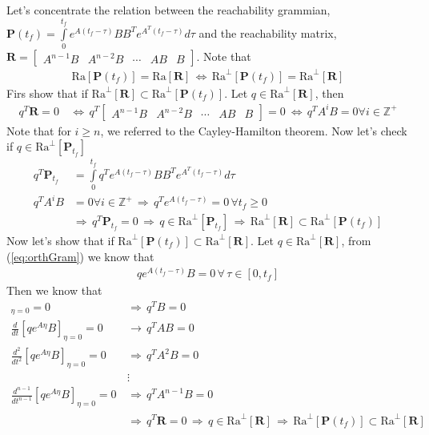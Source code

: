 \documentclass[twoside]{article}
\begin{document}
Let's concentrate the relation between the reachability grammian, $\textbf{P}(t_f) = \int\limits_{0}^{t_f} e^{A (t_f - \tau)} B B^T e^{A^T (t_f - \tau)}  d \tau $ 
and the reachability matrix, $\mathbf{R} = \left[ \begin{array}{c|c|c|c|c} A^{n-1} B & A^{n-2} B & \cdots & A B & B \end{array} \right] $. Note that 
%
\begin{align*}
  \mathrm{Ra}[ \textbf{P}(t_f) ] = \mathrm{Ra}[ \mathbf{R} ]
  \, \iff \, \mathrm{Ra}^\perp [ \textbf{P}(t_f) ] = \mathrm{Ra}^\perp [ \mathbf{R} ]
\end{align*}
%
Firs show that if $\mathrm{Ra}^\perp [ \mathbf{R} ] \subset \mathrm{Ra}^\perp [ \textbf{P}(t_f) ]$.
Let $q \in \mathrm{Ra}^\perp [ \mathbf{R} ] $, then 
%
\begin{align*}
  q^T \mathbf{R} = 0 \, &\iff \, q^T \left[ \begin{array}{c|c|c|c|c} A^{n-1} B & A^{n-2} B & \cdots & A B & B \end{array} \right] = 0 \ \iff \, q^T A^i B = 0 \forall i \in \mathbb{Z^+}
\end{align*}
%
Note that for $i \geq n$, we referred to the Cayley-Hamilton theorem. Now let's check if 
$q \in \mathrm{Ra}^\perp [ \mathbf{P}_{t_f} ] $
%
\begin{align*}
  q^T \mathbf{P}_{t_f} &= \int\limits_{0}^{t_f} q^T e^{A (t_f - \tau)} B B^T e^{A^T (t_f - \tau)}  d \tau 
  \\
  q^T A^i B &= 0 \forall i \in \mathbb{Z^+} \, \Rightarrow \, q^T e^{A (t_f - \tau)} = 0 \, \forall t_f \geq 0
  \\
  &\Rightarrow \, q^T \mathbf{P}_{t_f} = 0 \, \Rightarrow \, q \in \mathrm{Ra}^\perp [ \mathbf{P}_{t_f} ]
  \, \Rightarrow \, \mathrm{Ra}^\perp [ \mathbf{R} ] \subset \mathrm{Ra}^\perp [ \textbf{P}(t_f) ]
\end{align*}
%
Now let's show that if $\mathrm{Ra}^\perp [ \textbf{P}(t_f) ] \subset \mathrm{Ra}^\perp [ \mathbf{R} ]$.
Let $q \in \mathrm{Ra}^\perp [ \mathbf{R} ] $, from (\ref{eq:orthGram}) we know that 
%
\begin{align*}
  q e^{A (t_f - \tau)} B = 0 \, \forall \, \tau \in [0 , t_f]
\end{align*}
%
Then we know that 
%
\begin{align*}
  [ q e^{A \eta} B]_{\eta = 0} = 0 \, &\Rightarrow \, q^T B = 0
  \\
  \frac{d}{dt}[ q e^{A \eta} B]_{\eta = 0} = 0 \, &\rightarrow \, q^T A B = 0
  \\
  \frac{d^2}{dt^2}[ q e^{A \eta} B]_{\eta = 0} = 0 \, &\Rightarrow \, q^T A^2 B = 0
  \\
  &\vdots
    \\
    \frac{d^{n-1}}{dt^{n-1}}[ q e^{A \eta} B]_{\eta = 0} = 0 \, &\Rightarrow \, q^T A^{n-1} B = 0
    \\
    &\Rightarrow \, q^T \mathbf{R} = 0 \, \Rightarrow \, q \in \mathrm{Ra}^\perp [ \mathbf{R} ]
    \, \Rightarrow \, \mathrm{Ra}^\perp [ \textbf{P}(t_f) ] \subset \mathrm{Ra}^\perp [ \mathbf{R} ]
\end{align*}
\end{document}

